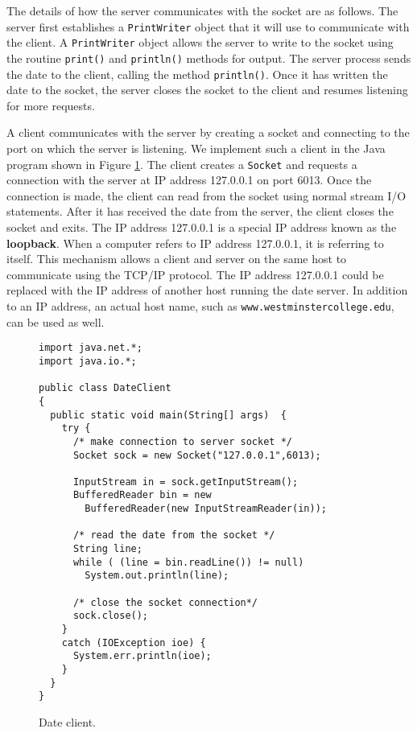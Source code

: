 The details of how the server communicates with the socket are as follows. The server first establishes a \texttt{PrintWriter} object that it will use to communicate with the client. A \texttt{PrintWriter} object allows the server to write to the socket using the routine \texttt{print()} and \texttt{println()} methods for output. The server process sends the date to the client, calling the method \texttt{println()}. Once it has written the date to the socket, the server closes the socket to the client and resumes listening for more requests.

A client communicates with the server by creating a socket and connecting to the port on which the server is listening. We implement such a client in the Java program shown in Figure \ref{fig:date-client}. The client creates a \texttt{Socket} and requests a connection with the server at IP address 127.0.0.1 on port 6013. Once the connection is made, the client can read from the socket using normal stream I/O statements. After it has received the date from the server, the client closes the socket and exits. The IP address 127.0.0.1 is a special IP address known as the \textbf{loopback}. When a computer refers to IP address 127.0.0.1, it is referring to itself. This mechanism allows a client and server on the same host to communicate using the TCP/IP protocol. The IP address 127.0.0.1 could be replaced with the IP address of another host running the date server. In addition to an IP address, an actual host name, such as \texttt{www.westminstercollege.edu}, can be used as well.

\begin{figure}[h!]
\centering
\begin{verbatim}
import java.net.*;
import java.io.*;
 
public class DateClient
{
  public static void main(String[] args)  {
    try {
      /* make connection to server socket */
      Socket sock = new Socket("127.0.0.1",6013);
 
      InputStream in = sock.getInputStream();
      BufferedReader bin = new
        BufferedReader(new InputStreamReader(in));
 
      /* read the date from the socket */
      String line;
      while ( (line = bin.readLine()) != null)
        System.out.println(line);
 
      /* close the socket connection*/
      sock.close();
    }
    catch (IOException ioe) {
      System.err.println(ioe);
    }
  }
}
\end{verbatim}
\caption{Date client.}\label{fig:date-client}
\end{figure}

